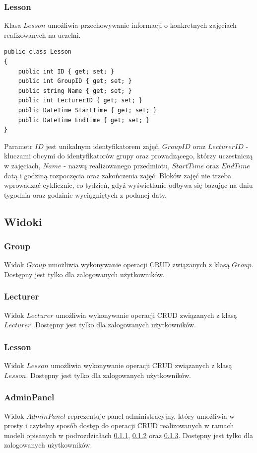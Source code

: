 \documentclass[]{article}
\begin{document}
\subsubsection{Lesson}
Klasa $Lesson$ umożliwia przechowywanie informacji o konkretnych zajęciach realizowanych na uczelni.
\begin{lstlisting}
public class Lesson
{
    public int ID { get; set; }
    public int GroupID { get; set; }
    public string Name { get; set; }
    public int LecturerID { get; set; }
    public DateTime StartTime { get; set; }
    public DateTime EndTime { get; set; }
}
\end{lstlisting}
Parametr $ID$ jest unikalnym identyfikatorem zajęć, $GroupID$ oraz $LecturerID$ - kluczami obcymi do identyfikatorów grupy oraz prowadzącego, którzy uczestniczą w zajęciach, $Name$ - nazwą realizowanego przedmiotu, $StartTime$ oraz $EndTime$ datą i godziną rozpoczęcia oraz zakończenia zajęć. Bloków zajęć nie trzeba wprowadzać cyklicznie, co tydzień, gdyż wyświetlanie odbywa się bazując na dniu tygodnia oraz godzinie wyciągniętych z podanej daty.

\subsection{Widoki}

\subsubsection{Group} \label{view-group}
Widok $Group$ umożliwia wykonywanie operacji CRUD związanych z klasą $Group$. Dostępny jest tylko dla zalogowanych użytkowników.
\subsubsection{Lecturer} \label{view-lecturer}
Widok $Lecturer$ umożliwia wykonywanie operacji CRUD związanych z klasą $Lecturer$. Dostępny jest tylko dla zalogowanych użytkowników.
\subsubsection{Lesson} \label{view-lesson}
Widok $Lesson$ umożliwia wykonywanie operacji CRUD związanych z klasą $Lesson$. Dostępny jest tylko dla zalogowanych użytkowników.
\subsubsection{AdminPanel}
Widok $AdminPanel$ reprezentuje panel administracyjny, który umożliwia w prosty i czytelny sposób dostęp do operacji CRUD realizowanych w ramach modeli opisanych w podrozdziałach \ref{view-group}, \ref{view-lecturer} oraz \ref{view-lesson}. Dostępny jest tylko dla zalogowanych użytkowników.
\end{document}
